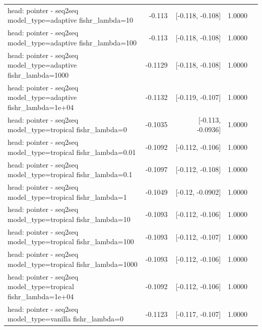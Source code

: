 \documentclass[10pt]{article}
\makeatletter
\newcommand{\stackcell}[1]{\begin{tabular}[t]{@{}l@{}}#1\end{tabular}}
\makeatother
\begin{document}
{\begin{longtable}{lrrrl}
\stackcell{head: pointer - seq2seq\\\footnotesize model\_type=adaptive fishr\_lambda=10 } & -0.113 & [-0.118, -0.108] & 1.0000 & \\
\stackcell{head: pointer - seq2seq\\\footnotesize model\_type=adaptive fishr\_lambda=100 } & -0.113 & [-0.118, -0.108] & 1.0000 & \\
\stackcell{head: pointer - seq2seq\\\footnotesize model\_type=adaptive fishr\_lambda=1000 } & -0.1129 & [-0.118, -0.108] & 1.0000 & \\
\stackcell{head: pointer - seq2seq\\\footnotesize model\_type=adaptive fishr\_lambda=1e+04 } & -0.1132 & [-0.119, -0.107] & 1.0000 & \\
\stackcell{head: pointer - seq2seq\\\footnotesize model\_type=tropical fishr\_lambda=0 } & -0.1035 & [-0.113, -0.0936] & 1.0000 & \\
\stackcell{head: pointer - seq2seq\\\footnotesize model\_type=tropical fishr\_lambda=0.01 } & -0.1092 & [-0.112, -0.106] & 1.0000 & \\
\stackcell{head: pointer - seq2seq\\\footnotesize model\_type=tropical fishr\_lambda=0.1 } & -0.1097 & [-0.112, -0.108] & 1.0000 & \\
\stackcell{head: pointer - seq2seq\\\footnotesize model\_type=tropical fishr\_lambda=1 } & -0.1049 & [-0.12, -0.0902] & 1.0000 & \\
\stackcell{head: pointer - seq2seq\\\footnotesize model\_type=tropical fishr\_lambda=10 } & -0.1093 & [-0.112, -0.106] & 1.0000 & \\
\stackcell{head: pointer - seq2seq\\\footnotesize model\_type=tropical fishr\_lambda=100 } & -0.1093 & [-0.112, -0.107] & 1.0000 & \\
\stackcell{head: pointer - seq2seq\\\footnotesize model\_type=tropical fishr\_lambda=1000 } & -0.1093 & [-0.112, -0.106] & 1.0000 & \\
\stackcell{head: pointer - seq2seq\\\footnotesize model\_type=tropical fishr\_lambda=1e+04 } & -0.1092 & [-0.112, -0.106] & 1.0000 & \\
\stackcell{head: pointer - seq2seq\\\footnotesize model\_type=vanilla fishr\_lambda=0 } & -0.1123 & [-0.117, -0.107] & 1.0000 & \\

\end{longtable}}
\end{document}
